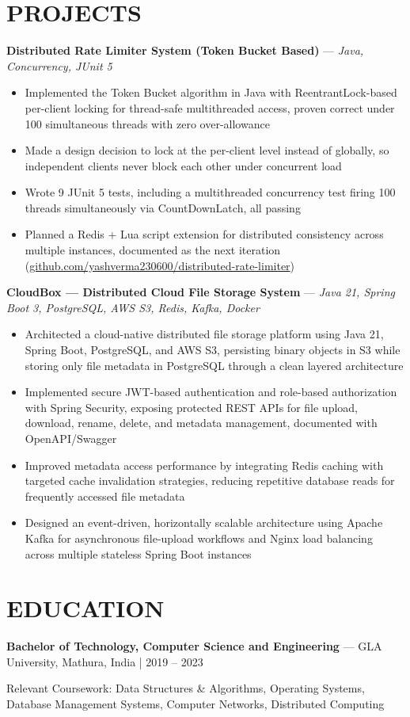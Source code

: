 \documentclass[10.5pt,a4paper]{article}
\newcommand{\proj}[2]{\vspace{4pt}\textbf{#1} \hspace{0.3em}---\hspace{0.3em} \textit{#2}\par\vspace{-1pt}}
\newenvironment{bul}{\begin{itemize}[leftmargin=2.2em,itemsep=2pt,topsep=2pt,parsep=0pt,label=\textbullet]}{\end{itemize}}
\begin{document}
\section{PROJECTS}
\proj{Distributed Rate Limiter System (Token Bucket Based)}{Java, Concurrency, JUnit 5}
\begin{bul}
\item Implemented the Token Bucket algorithm in Java with ReentrantLock-based per-client locking for thread-safe multithreaded access, proven correct under 100 simultaneous threads with zero over-allowance
\item Made a design decision to lock at the per-client level instead of globally, so independent clients never block each other under concurrent load
\item Wrote 9 JUnit 5 tests, including a multithreaded concurrency test firing 100 threads simultaneously via CountDownLatch, all passing
\item Planned a Redis + Lua script extension for distributed consistency across multiple instances, documented as the next iteration (\href{https://github.com/yashverma230600/distributed-rate-limiter}{github.com/yashverma230600/distributed-rate-limiter})
\end{bul}

\proj{CloudBox --- Distributed Cloud File Storage System}{Java 21, Spring Boot 3, PostgreSQL, AWS S3, Redis, Kafka, Docker}
\begin{bul}
\item Architected a cloud-native distributed file storage platform using Java 21, Spring Boot, PostgreSQL, and AWS S3, persisting binary objects in S3 while storing only file metadata in PostgreSQL through a clean layered architecture
\item Implemented secure JWT-based authentication and role-based authorization with Spring Security, exposing protected REST APIs for file upload, download, rename, delete, and metadata management, documented with OpenAPI/Swagger
\item Improved metadata access performance by integrating Redis caching with targeted cache invalidation strategies, reducing repetitive database reads for frequently accessed file metadata
\item Designed an event-driven, horizontally scalable architecture using Apache Kafka for asynchronous file-upload workflows and Nginx load balancing across multiple stateless Spring Boot instances
\end{bul}

\section{EDUCATION}
\textbf{Bachelor of Technology, Computer Science and Engineering} \hspace{0.3em}---\hspace{0.3em} GLA University, Mathura, India \hfill {\color{greytxt}\small | 2019 -- 2023}\par\vspace{2pt}
Relevant Coursework: Data Structures \& Algorithms, Operating Systems, Database Management Systems, Computer Networks, Distributed Computing
\end{document}
